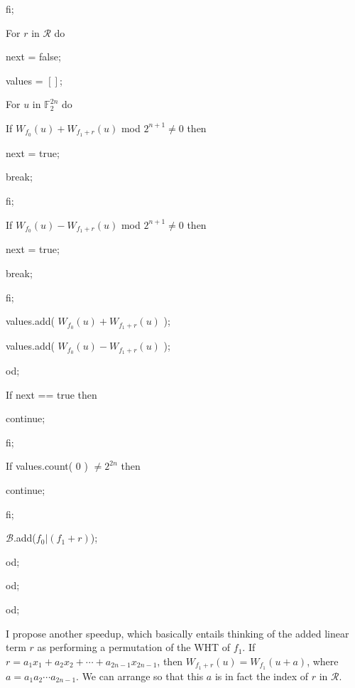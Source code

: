 \documentclass[12pt]{amsart}
\newcommand{\F}{\mathbb{F}}
\newcommand{\tab}{\hspace*{2em}}
\begin{document}
\tab \tab fi;

\tab \tab For $r$ in $\mathcal{R}$ do

\tab \tab \tab next = false;

\tab \tab \tab values = $[]$;

\tab \tab \tab For $u$ in $\F_2^{2n}$ do

\tab \tab \tab \tab If $W_{f_0}(u) + W_{f_1+r}(u)$ mod $2^{n+1} \neq 0$ then

\tab \tab \tab \tab \tab next = true;

\tab \tab \tab \tab \tab break;

\tab \tab \tab \tab fi;

\tab \tab \tab \tab If $W_{f_0}(u) - W_{f_1+r}(u)$ mod $2^{n+1} \neq 0$ then

\tab \tab \tab \tab \tab next = true;

\tab \tab \tab \tab \tab break;

\tab \tab \tab \tab fi;

\tab \tab \tab \tab values.add( $W_{f_0}(u) + W_{f_1+r}(u)$ );

\tab \tab \tab \tab values.add( $W_{f_0}(u) - W_{f_1+r}(u)$ );

\tab \tab \tab od;

\tab \tab \tab If next == true then

\tab \tab \tab \tab continue;

\tab \tab \tab fi;

\tab \tab \tab If values.count( $0$ ) $\neq 2^{2n}$ then

\tab \tab \tab \tab continue;

\tab \tab \tab fi;

\tab \tab \tab $\mathcal{B}$.add($f_0|(f_1+r)$);

\tab \tab od;

\tab od;

od;

\newpage

I propose another speedup, which basically entails thinking of the added linear term $r$ as performing a permutation of the WHT of $f_1$.  If $r = a_1x_1 + a_2x_2 + \cdots + a_{2n-1}x_{2n-1}$, then $W_{f_1+r}(u) = W_{f_1}(u + a)$, where $a = a_1a_2 \cdots a_{2n-1}$.  We can arrange so that this $a$ is in fact the index of $r$ in $\mathcal{R}$.
\end{document}
